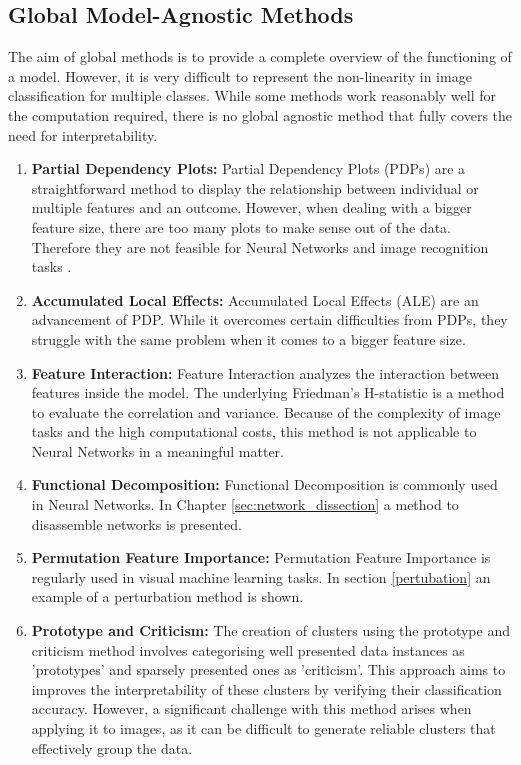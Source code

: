 \subsection{Global Model-Agnostic Methods}

The aim of global methods is to provide a complete overview of the functioning of a model. However, it is very difficult to represent the non-linearity in image classification for multiple classes. While some methods work reasonably well for the computation required, there is no global agnostic method that fully covers the need for interpretability.

\begin{enumerate}
	\item \textbf{Partial Dependency Plots:} Partial Dependency Plots (PDPs) are a straightforward method to display the relationship between individual or multiple features and an outcome. However, when dealing with a bigger feature size, there are too many plots to make sense out of the data. Therefore they are not feasible for Neural Networks and image recognition tasks \cite{PDP}.
	\item \textbf{Accumulated Local Effects:} Accumulated Local Effects (ALE) are an advancement of PDP. While it overcomes certain difficulties from PDPs, they struggle with the same problem when it comes to a bigger feature size.
	\item \textbf{Feature Interaction:} Feature Interaction analyzes the interaction between features inside the model. The underlying Friedman's H-statistic is a method to evaluate the correlation and variance. Because of the complexity of image tasks and the high computational costs, this method is not applicable to Neural Networks in a meaningful matter.
	\item \textbf{Functional Decomposition:} Functional Decomposition is commonly used in Neural Networks. In Chapter \ref{sec:network_dissection} a method to disassemble networks is presented.
	\item \textbf{Permutation Feature Importance:} Permutation Feature Importance is regularly used in visual machine learning tasks. In section \ref{pertubation} an example of a perturbation method is shown.
	\item \textbf{Prototype and Criticism:} The creation of clusters using the prototype and criticism method involves categorising well presented data instances as 'prototypes' and sparsely presented ones as 'criticism'. This approach aims to improves the interpretability of these clusters by verifying their classification accuracy. However, a significant challenge with this method arises when applying it to images, as it can be difficult to generate reliable clusters that effectively group the data.
\end{enumerate}



